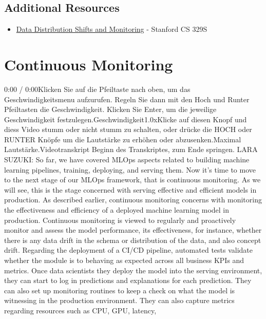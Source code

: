 {{{{{{{{    \subsection{Additional Resources}
    
    \begin{itemize}
      \item \href{https://docs.google.com/document/d/14uX2m9q7BUn_mgnM3h6if-s-r0MZrvDb-ZHNjgA1Uyo/edit}{Data Distribution Shifts and Monitoring} - Stanford CS 329S
    \end{itemize}
            
\section{Continuous Monitoring}

    0:00 / 0:00Klicken Sie auf die Pfeiltaste nach oben, um das Geschwindigkeitsmenu aufzurufen. Regeln Sie dann mit den Hoch und Runter Pfeiltasten die Geschwindigkeit. Klicken Sie Enter, um die jeweilige Geschwindigkeit festzulegen.Geschwindigkeit1.0xKlicke auf diesen Knopf und diess Video stumm oder nicht stumm zu schalten, oder drücke die HOCH oder RUNTER Knöpfe um die Lautstärke zu erhöhen oder abzusenken.Maximal Lautstärke.Videotranskript
    Beginn des Transkriptes, zum Ende springen.
    LARA SUZUKI: So far, we have covered MLOps aspects
    related to building machine learning pipelines, training, deploying,
    and serving them.
    Now it's time to move to the next stage of our MLOps framework,
    that is continuous monitoring.
    As we will see, this is the stage concerned
    with serving effective and efficient models in production.
    As described earlier, continuous monitoring
    concerns with monitoring the effectiveness and efficiency
    of a deployed machine learning model in production.
    Continuous monitoring is viewed to regularly and proactively
    monitor and assess the model performance, its effectiveness,
    for instance, whether there is any data drift in the schema or distribution
    of the data, and also concept drift.
    Regarding the deployment of a CI/CD pipeline,
    automated tests validate whether the module
    is to behaving as expected across all business KPIs and metrics.
    Once data scientists they deploy the model into the serving environment,
    they can start to log in predictions and explanations for each prediction.
    They can also set up monitoring routines to keep
    a check on what the model is witnessing in the production environment.
    They can also capture metrics regarding resources such as CPU, GPU, latency,
}}}}}}}}
